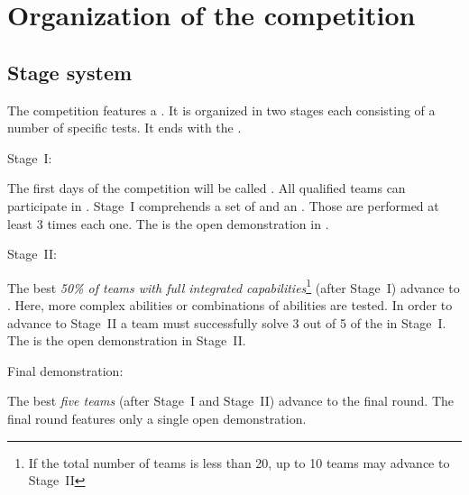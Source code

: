 \section{Organization of the competition}
\label{sec:procedure_during_competition}

\subsection{Stage system}\label{rule:stages}

The competition features a . It is organized in two stages each consisting of a number of specific tests. It ends with the .

\begin{enumerate}
	{\bf\item Stage~I:} The first days of the competition will be called . All qualified teams can participate in . Stage~I comprehends a set of  and an . Those  are performed at least 3 times each one. The  is the open demonstration in .

	{\bf\item Stage~II:} The best \emph{50\% of teams with full integrated capabilities}\footnote{If the total number of teams is less than 20, up to 10 teams may advance to Stage~II} (after Stage~I) advance to . Here, more complex abilities or combinations of abilities are tested. In order to advance to Stage~II a team must successfully solve 3 out of 5 of the  in Stage~I. \\
	The  is the open demonstration in Stage~II.
	{\bf\item Final demonstration:} The best \emph{five teams} (after Stage~I and Stage~II) advance to the final round. The final round features only a single open demonstration.
\end{enumerate}


